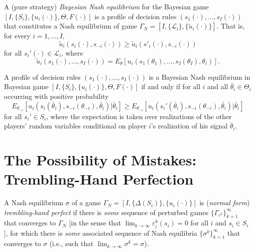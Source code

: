 \begin{defn}
    A (pure strategy) \emph{Bayesian Nash equilibrium} for the Bayesian game $[I, \{S_i\}, \{u_i(\cdot)\}, \Theta, F(\cdot)]$ is a profile of decision rules $(s_1(\cdot), \dots, s_I(\cdot))$ that constitutes a Nash equilibrium of game $\Gamma_N = [I, \{\mathscr{L}_i\}, \{\tilde{u}_i(\cdot)\}]$. That is, for every $i = 1, \dots, I$,
    \begin{equation*}
        \tilde{u}_i \left(s_i(\cdot), s_{-i}(\cdot)\right) \geq \tilde{u}_i \left(s'_i(\cdot), s_{-i}(\cdot)\right)
    \end{equation*}
    for all $s_i'(\cdot) \in \mathscr{L}_i$, where 
    \begin{equation*}
        \tilde{u}_i \left(s_1(\cdot), \dots, s_I(\cdot) \right) = E_\theta \left[ u_i \left(s_1(\theta_1), \dots, s_I(\theta_I), \theta_i \right) \right].
    \end{equation*}
\end{defn}

\begin{prop}
    A profile of decision rules $(s_1(\cdot), \dots, s_I(\cdot))$ is a Bayesian Nash equilibrium in Bayesian game $[I, \{S_i\}, \{u_i(\cdot)\}, \Theta, F(\cdot)]$ if and only if for all $i$ and all $\bar{\theta}_i \in \Theta_i$ occurring with positive probability
    \begin{equation*}
        E_{\theta_{-i}} \left[ u_i \left( s_i (\bar{\theta}_i), s_{-i}(\theta_{-i}), \bar{\theta}_i \right) | \bar{\theta}_i \right] \geq E_{\theta_{-i}} \left[ u_i \left( s_i' (\bar{\theta}_i), s_{-i}(\theta_{-i}), \bar{\theta}_i \right) | \bar{\theta}_i \right]
    \end{equation*}
    for all $s_i' \in S_i$, where the expectation is taken over realizations of the other players' random variables conditional on player $i$'s realization of his signal $\bar{\theta}_i$.
\end{prop}


\section{The Possibility of Mistakes: Trembling-Hand Perfection}

\begin{defn}
    A Nash equilibrium $\sigma$ of a game $\Gamma_N = [I, \{\Delta(S_i)\}, \{u_i(\cdot)\}]$ is (\emph{normal form}) \emph{trembling-hand perfect} if there is \emph{some} sequence of perturbed games $\{\Gamma_{\varepsilon^k}\}_{k = 1}^\infty$ that converges to $\Gamma_N$ [in the sense that $\lim_{k \to \infty} \varepsilon_i^k (s_i) = 0$ for all $i$ and $s_i \in S_i$], for which there is \emph{some} associated sequence of Nash equilibria $\{\sigma^k\}_{k = 1}^\infty$ that converges to $\sigma$ (i.e., such that $\lim_{k \to \infty} \sigma^k = \sigma$).
\end{defn}

